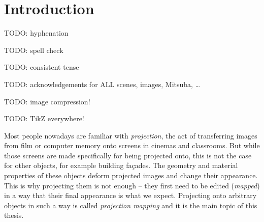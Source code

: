 \chapter{Introduction}
\label{chapter:intro}

{\color{red} TODO: hyphenation}

{\color{red} TODO: spell check}

{\color{red} TODO: consistent tense}

{\color{red} TODO: acknowledgements for ALL scenes, images, Mitsuba, \dots}

{\color{red} TODO: image compression!}

{\color{red} TODO: TikZ everywhere!}

Most people nowadays are familiar with \textit{projection}, the act of transferring images from film or computer memory onto screens in cinemas and classrooms. But while those screens are made specifically for being projected onto, this is not the case for other objects, for example building façades. The geometry and material properties of these objects deform projected images and change their appearance. This is why projecting them is not enough -- they first need to be edited (\textit{mapped}) in a way that their final appearance is what we expect. Projecting onto arbitrary objects in such a way is called \textit{projection mapping} and it is the main topic of this thesis.

